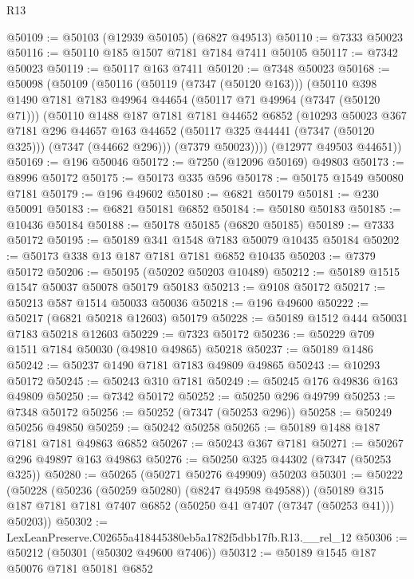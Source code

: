 \begin{lexlean}{R13}
\begin{coremodule}
@50109 := @50103 (@12939 @50105) (@6827 @49513)
@50110 := @7333 @50023
@50116 := @50110 @185 @1507 @7181 @7184 @7411 @50105
@50117 := @7342 @50023
@50119 := @50117 @163 @7411
@50120 := @7348 @50023
@50168 := @50098
    (@50109
      (@50116
        (@50119 (@7347 (@50120 @163)))
        (@50110
          @398
          @1490
          @7181
          @7183
          @49964
          @44654
          (@50117 @71 @49964 (@7347 (@50120 @71)))
          (@50110
            @1488
            @187
            @7181
            @7181
            @44652
            @6852
            (@10293
              @50023
              @367
              @7181
              @296
              @44657
              @163
              @44652
              (@50117 @325 @44441 (@7347 (@50120 @325)))
              (@7347 (@44662 @296)))
            (@7379 @50023))))
      (@12977 @49503 @44651))
@50169 := @196 @50046
@50172 := @7250 (@12096 @50169) @49803
@50173 := @8996 @50172
@50175 := @50173 @335 @596
@50178 := @50175 @1549 @50080 @7181
@50179 := @196 @49602
@50180 := @6821 @50179
@50181 := @230 @50091
@50183 := @6821 @50181 @6852
@50184 := @50180 @50183
@50185 := @10436 @50184
@50188 := @50178 @50185 (@6820 @50185)
@50189 := @7333 @50172
@50195 := @50189 @341 @1548 @7183 @50079 @10435 @50184
@50202 := @50173 @338 @13 @187 @7181 @7181 @6852 @10435
@50203 := @7379 @50172
@50206 := @50195 (@50202 @50203 @10489)
@50212 := @50189 @1515 @1547 @50037 @50078 @50179 @50183
@50213 := @9108 @50172
@50217 := @50213 @587 @1514 @50033 @50036
@50218 := @196 @49600
@50222 := @50217 (@6821 @50218 @12603) @50179
@50228 := @50189 @1512 @444 @50031 @7183 @50218 @12603
@50229 := @7323 @50172
@50236 := @50229 @709 @1511 @7184 @50030 (@49810 @49865) @50218
@50237 := @50189 @1486
@50242 := @50237 @1490 @7181 @7183 @49809 @49865
@50243 := @10293 @50172
@50245 := @50243 @310 @7181
@50249 := @50245 @176 @49836 @163 @49809
@50250 := @7342 @50172
@50252 := @50250 @296 @49799
@50253 := @7348 @50172
@50256 := @50252 (@7347 (@50253 @296))
@50258 := @50249 @50256 @49850
@50259 := @50242 @50258
@50265 := @50189 @1488 @187 @7181 @7181 @49863 @6852
@50267 := @50243 @367 @7181
@50271 := @50267 @296 @49897 @163 @49863
@50276 := @50250 @325 @44302 (@7347 (@50253 @325))
@50280 := @50265 (@50271 @50276 @49909) @50203
@50301 := @50222
    (@50228
      (@50236 (@50259 @50280) (@8247 @49598 @49588))
      (@50189 @315 @187 @7181 @7181 @7407 @6852 (@50250 @41 @7407 (@7347 (@50253 @41))) @50203))
@50302 := LexLeanPreserve.C02655a418445380eb5a1782f5dbb17fb.R13.__rel_12
@50306 := @50212 (@50301 (@50302 @49600 @7406))
@50312 := @50189 @1545 @187 @50076 @7181 @50181 @6852

\end{coremodule}
\end{lexlean}
